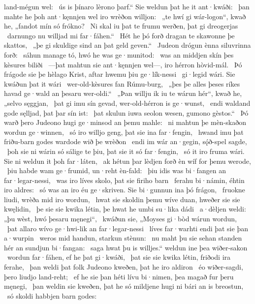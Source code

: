 land-mégun wel: \hld\ ús is þínaro lèrono þarf.“
Sie weldun þat he it ant·kwáði: \hld\ þan mahte he þoh ant·kęnnjen wel
iro wrèðon willjon: \hld\ „te hwí gi wár-logon“, kwað he,
„fandot mín só frókno? \hld\ Ni skal iu þat te frumu werðen,
þat gi dreogerjas \hld\ darnungo nu
willjad mi far·fáhen.“ \hld\ Hét he þó forð dragan
te skawonne þe skattos, \hld\ „þe gi skuldige sind
an þat geld geven.“ \hld\ Judeon drógun
ènna siluvrinna forð: \hld\ sáhun manage tó,
hwó he was ge·munitod: \hld\ was an middjen skín
þes kèsures biliði \hld\ —þat mahtun sie ant·kęnnjen wel—,
iro hérron hòvid-mál. \hld\ Þó frágode sie þe hèlago Krist,
aftar hwemu þiu ge·lík-nessi \hld\ gi·legid wári.
Sie kwáðun þat it wári \hld\ wer-old-kèsures
fan Rúmu-burg, \hld\ „þes þe alles þeses ríkes havad
ge·wald an þesaru wer-oldi.“ \hld\ „Þan willju ik iu te wárun hér“, kwað he,
„selvo sęggjan, \hld\ þat gi imu sín gevad,
wer-old-hérron is ge·wunst, \hld\ endi waldand gode
sęlljad, þat þar sín ist: \hld\ þat skulun iuwa seolon wesen,
gumono gèstos.“ \hld\ Þó warð þero Judeono hugi
ge·minsod an þemu mahle: \hld\ ni mahtun þe mèn-skaðon
wordun ge·winnen, \hld\ só iro willjo geng,
þat sie ina far·fengin, \hld\ hwand imu þat friðu-barn godes
wardode wið þe wrèðon \hld\ endi im wár an·gegin,
sǫ́ð-spel sagde, \hld\ þoh sie ni wárin só sálige te þiu,
þat sie it só far·fengin, \hld\ só it iro fruma wári.
Sie ni weldun it þoh far·láten, \hld\ ak hétun þar lèdjen forð
èn wíf for þemu werode, \hld\ þiu habde wam ge·frumid,
un·reht èn-fald: \hld\ þiu idis was bi·fangen
an far·legar-nessi, \hld\ was iro líves skolo,
þat sie firiho barn \hld\ ferahu bi·námin,
éhtin iro aldres: \hld\ só was an iro éu ge·skriven.
Sie bi·gunnun ina þó frágon, \hld\ fruokne liudi,
wrèða mid iro wordun, \hld\ hwat sie skoldin þemu wíve duan,
hweðer sie sie kwęlidin, \hld\ þe sie sie kwika létin,
þe hwat he umbi su·lika dádi \hld\ a·dèljen weldi:
„þu wèst, hwó þesaru męnegi“, \hld\ kwáðun sie, „Moyses gi·bòd
wárun wordun, \hld\ þat allaro wívo ge·hwi-lik
an far·legar-nessi \hld\ líves far·warhti
endi þat sie þan a·wurpin \hld\ weros mid handun,
starkun stènun: \hld\ nu maht þu sie sehan standen hér
an sundjun bi·fangan: \hld\ saga hwat þu is willjes.“
weldun ine þea wiðer-sakon \hld\ wordun far·fáhen,
ef he þat gi·kwáði, \hld\ þat sie sie kwika létin,
friðodi ira ferahe, \hld\ þan weldi þat folk Judeono
kweðen, þat he iro aldiron \hld\ éo wiðer-sagdi,
þero liudjo land-reht; \hld\ ef he sie þan héti lívu bi·nimen,
þea magað fur þeru męnegi, \hld\ þan weldin sie kweðen, þat he só mildjene hugi
ni bári an is breostun, \hld\ só skoldi habbjen barn godes:
